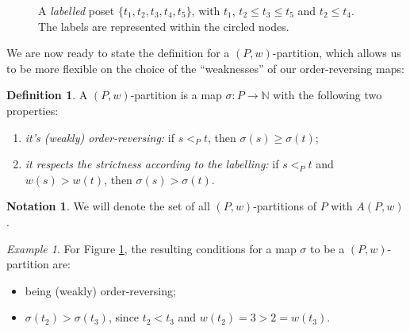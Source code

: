 \documentclass[11pt]{amsart}
\theoremstyle{plain}
\theoremstyle{definition}
\newtheorem{definition}{Definition}
\newtheorem*{notation}{Notation}
\theoremstyle{remark}
\newtheorem{example}{Example}[section]
\newcommand{\NN}{\mathbb{N}}
\numberwithin{equation}{section}
\begin{document}
\begin{figure}[h]
	\centering
	\caption{A \textit{labelled} poset $\{t_1, t_2, t_3, t_4, t_5\}$, with
		$t_1$, $t_2 \leq t_3 \leq t_5$ and $t_2 \leq t_4$. The labels are represented within
		the circled nodes.}
	\label{fig:example_labelled_poset}
\end{figure}

We are now ready to state the definition for a $(P, w)$-partition, which allows us to be more flexible on
the choice of the ``weaknesses'' of our order-reversing maps:

\begin{definition}
	A $(P, w)$-partition is a map $\sigma : P \to \NN$ with the following two properties:

	\begin{enumerate}[(i.)]
		\item \textit{it's (weakly) order-reversing:} if $s <_P t$, then $\sigma(s) \geq \sigma(t)$;
		\item \textit{it respects the strictness according to the labelling:} if $s <_P t$ and
		      $w(s) > w(t)$, then $\sigma(s) > \sigma(t)$.
	\end{enumerate}
\end{definition}

\begin{notation}
	We will denote the set of all $(P, w)$-partitions of $P$ with $A(P, w)$.
\end{notation}

\begin{example}
	For Figure \ref{fig:example_labelled_poset}, the resulting conditions for a map $\sigma$ to be
	a $(P, w)$-partition are:
	\begin{itemize}
		\item being (weakly) order-reversing;
		\item $\sigma(t_2) > \sigma(t_3)$, since $t_2 < t_3$ and $w(t_2) = 3 > 2 = w(t_3)$.
	\end{itemize}
\end{example}
\end{document}
